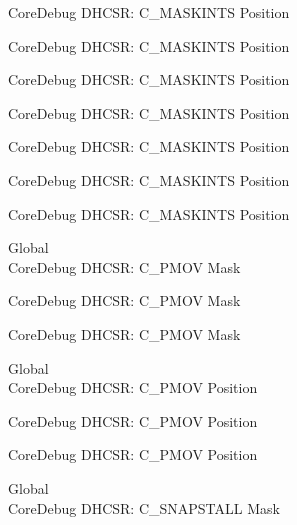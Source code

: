 \begin{DoxyRefList}
\label{deprecated__deprecated000121}%
%
Core\+Debug DHCSR\+: C\+\_\+\+MASKINTS Position 

\label{deprecated__deprecated000177}%
%
Core\+Debug DHCSR\+: C\+\_\+\+MASKINTS Position 

\label{deprecated__deprecated000260}%
%
Core\+Debug DHCSR\+: C\+\_\+\+MASKINTS Position 

\label{deprecated__deprecated000319}%
%
Core\+Debug DHCSR\+: C\+\_\+\+MASKINTS Position 

\label{deprecated__deprecated000395}%
%
Core\+Debug DHCSR\+: C\+\_\+\+MASKINTS Position 

\label{deprecated__deprecated000484}%
%
Core\+Debug DHCSR\+: C\+\_\+\+MASKINTS Position 

\label{deprecated__deprecated000586}%
%
Core\+Debug DHCSR\+: C\+\_\+\+MASKINTS Position  
\item[Global \doxylink{group___c_m_s_i_s___s_c_b_ga6c41fddb98d97a17f3e9020278a1aed1}{Core\+Debug\+\_\+\+DHCSR\+\_\+\+C\+\_\+\+PMOV\+\_\+\+Msk} ]\hfill \\
\label{deprecated__deprecated000030}%
%
Core\+Debug DHCSR\+: C\+\_\+\+PMOV Mask 

\label{deprecated__deprecated000481}%
%
Core\+Debug DHCSR\+: C\+\_\+\+PMOV Mask 

\label{deprecated__deprecated000583}%
%
Core\+Debug DHCSR\+: C\+\_\+\+PMOV Mask  
\item[Global \doxylink{group___c_m_s_i_s___s_c_b_gac414659dd5c8bd9c91ab94441ded720a}{Core\+Debug\+\_\+\+DHCSR\+\_\+\+C\+\_\+\+PMOV\+\_\+\+Pos} ]\hfill \\
\label{deprecated__deprecated000029}%
%
Core\+Debug DHCSR\+: C\+\_\+\+PMOV Position 

\label{deprecated__deprecated000480}%
%
Core\+Debug DHCSR\+: C\+\_\+\+PMOV Position 

\label{deprecated__deprecated000582}%
%
Core\+Debug DHCSR\+: C\+\_\+\+PMOV Position  
\item[Global \doxylink{group___c_m_s_i_s___core_debug_ga53aa99b2e39a67622f3b9973e079c2b4}{Core\+Debug\+\_\+\+DHCSR\+\_\+\+C\+\_\+\+SNAPSTALL\+\_\+\+Msk} ]\hfill \\
\label{deprecated__deprecated000032}%
%
Core\+Debug DHCSR\+: C\+\_\+\+SNAPSTALL Mask 


\end{DoxyRefList}
